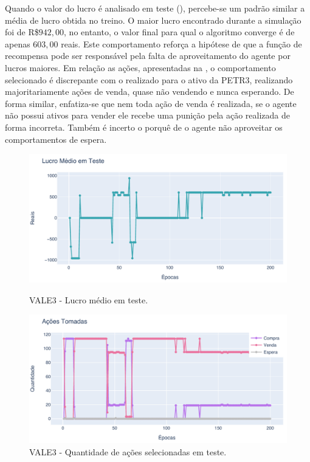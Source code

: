 Quando o valor do lucro é analisado em teste (), percebe-se um padrão similar a média de lucro obtida no treino. O maior lucro encontrado durante a simulação foi de R\$$942,00$, no entanto, o valor final para qual o algoritmo converge é de apenas $603,00$ reais. Este comportamento reforça a hipótese de que a função de recompensa pode ser responsável pela falta de aproveitamento do agente por lucros maiores. Em relação as ações, apresentadas na , o comportamento selecionado é discrepante com o realizado para o ativo da PETR3, realizando majoritariamente ações de venda, quase não vendendo e nunca esperando. De forma similar, enfatiza-se que nem toda ação de venda é realizada, se o agente não possui ativos para vender ele recebe uma punição pela ação realizada de forma incorreta. Também é incerto o porquê de o agente não aproveitar os comportamentos de espera.

\begin{figure}[htbp]
    \centering 
    \begin{minipage}[b]{0.45\linewidth}
        \includegraphics[width=\linewidth]{img/ddpg/vale3/clean/profit}
        \caption{VALE3 - Lucro médio em teste.} 
        \label{vale_clean_profit}
    \end{minipage}
    \quad
    \begin{minipage}[b]{0.45\linewidth}
        \includegraphics[width=\linewidth]{img/ddpg/vale3/clean/actions}
        \caption{VALE3 - Quantidade de ações selecionadas em teste.}
        \label{vale_clean_act}
    \end{minipage}
\end{figure}

